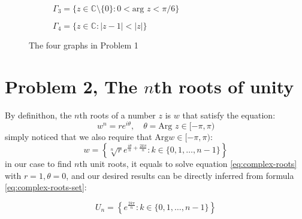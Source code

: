 \documentclass{article}
\numberwithin{equation}{section}
\newcommand{\abs}[1]{\left\vert #1 \right\vert}
\begin{document}
\begin{figure}[htbp]
\begin{subfigure}[b]{.4\linewidth}
\begin{tikzpicture}
			
		\end{tikzpicture}
		\caption{$\Gamma_3=\{z\in \mathbb{C}\setminus \{0\} : 0< \textrm{arg } z < \pi/6\}$}
	\end{subfigure}
	\hfill
	\begin{subfigure}[b]{.4\linewidth}
		\centering
		\caption{$\Gamma_4=\{z\in\mathbb{C}: \abs{z-1}<\abs{z}\}$}
	\end{subfigure}
\caption{The four graphs in Problem 1}
\label{fig:1}
\end{figure}


\section[Problem 2, The nth roots of unity]{Problem 2, The $n$th roots of unity}
By definithon, the $n$th roots of a number $z$ is $w$ that satisfy the equation:
\begin{equation}\label{eq:complex-roots}
	w^n =re^{i\theta},\quad \theta = \textrm{Arg }z \in [-\pi,\pi)
\end{equation}
simply noticed that we also require that $\mathrm{Arg }w\in [-\pi,\pi)$:
\begin{equation}\label{eq:complex-roots-set}
	w =\left\{ \sqrt[n]{r}e^{\frac{i\theta}{n}+\frac{2k\pi}{n}}: k\in\{0,1,\ldots, n-1\}\right\}
\end{equation}
in our case to find $n$th unit roots, it equals to solve equation \ref{eq:complex-roots} with $r=1, \theta=0$, and our desired results can be directly inferred from formula \ref{eq:complex-roots-set}:

\begin{equation}
	U_n =\left\{e^{\frac{2k\pi}{n}}: k\in\{0,1,\ldots,n-1\}\right\}
\end{equation}
\end{document}
